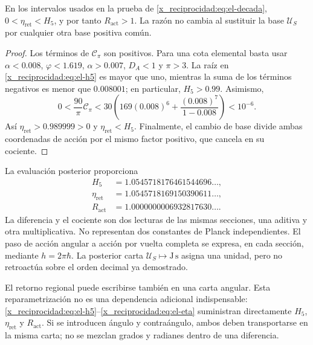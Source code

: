 \begin{proposition}
En los intervalos usados en la prueba de \eqref{x_reciprocidad:eq:el-decada},
\(0<\eta_{\mathrm{ret}}<H_5\), y por tanto
\(R_{\mathrm{act}}>1\). La razón no cambia al sustituir la base
\(\mathcal U_S\) por cualquier otra base positiva común.
\end{proposition}
\begin{proof}
Los términos de \(\mathcal C_\pi\) son positivos. Para una cota
elemental basta usar \(\alpha<0.008\), \(\varphi<1.619\),
\(\alpha>0.007\), \(D_A<1\) y \(\pi>3\). La raíz en
\eqref{x_reciprocidad:eq:el-h5} es mayor que uno, mientras la suma de los términos
negativos es menor que \(0.008001\); en particular, \(H_5>0.99\).
Asimismo,
\[
 0<\frac{90}{\pi}\mathcal C_\pi
 <30\left(169(0.008)^6+
           \frac{(0.008)^7}{1-0.008}\right)<10^{-6}.
\]
Así \(\eta_{\mathrm{ret}}>0.989999>0\) y
\(\eta_{\mathrm{ret}}<H_5\). Finalmente, el cambio de base divide
ambas coordenadas de acción por el mismo factor positivo, que cancela en
su cociente.
\end{proof}

La evaluación posterior proporciona
\begin{align*}
 H_5&=1.0545718176461544696\ldots,\\
 \eta_{\mathrm{ret}}&=1.0545718169150390611\ldots,\\
 R_{\mathrm{act}}&=1.0000000006932817630\ldots.
\end{align*}
La diferencia y el cociente son dos lecturas de las mismas secciones,
una aditiva y otra multiplicativa. No representan dos constantes de
Planck independientes. El paso de acción angular a acción por vuelta
completa se expresa, en cada sección, mediante
\(h=2\pi\hbar\). La posterior carta
\(\mathcal U_S\mapsto\mathrm{J\,s}\) asigna una unidad, pero no
retroactúa sobre el orden decimal ya demostrado.

El retorno regional puede escribirse también en una carta angular.
Esta reparametrización no es una dependencia adicional indispensable:
\eqref{x_reciprocidad:eq:el-h5}--\eqref{x_reciprocidad:eq:el-eta} suministran directamente
\(H_5\), \(\eta_{\mathrm{ret}}\) y \(R_{\mathrm{act}}\). Si se
introducen ángulo y contraángulo, ambos deben transportarse en la misma
carta; no se mezclan grados y radianes dentro de una diferencia.


